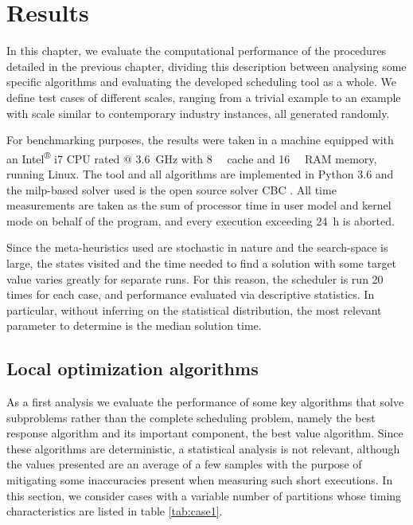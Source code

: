 \documentclass[main.tex]{subfiles}
\begin{document}
\chapter{Results}
\label{sec:results}

In this chapter, we evaluate the computational performance of the procedures detailed in the previous chapter, dividing this description between analysing some specific algorithms and evaluating the developed scheduling tool as a whole.
We define test cases of different scales, ranging from a trivial example to an example with scale similar to contemporary industry instances, all generated randomly.

For benchmarking purposes, the results were taken in a machine equipped with an Intel\textsuperscript{®} i7 CPU rated @ \SI{3.6}{\giga\hertz} with \SI{8}{\mega\byte} cache and \SI{16}{\giga\byte} RAM memory, running Linux.
The tool and all algorithms are implemented in Python 3.6 and the \gls{milp}-based solver used is the open source solver CBC \cite{cbc-solver}.
All time measurements are taken as the sum of processor time in user model and kernel mode on behalf of the program, and every execution exceeding \SI{24}{\hour} is aborted.

Since the meta-heuristics used are stochastic in nature and the search-space is large, the states visited and the time needed to find a solution with some target value varies greatly for separate runs.
For this reason, the scheduler is run \num{20} times for each case, and performance evaluated via descriptive statistics.
In particular, without inferring on the statistical distribution, the most relevant parameter to determine is the median solution time.

\section{Local optimization algorithms}

As a first analysis we evaluate the performance of some key algorithms that solve subproblems rather than the complete scheduling problem, namely the best response algorithm and its important component, the best value algorithm.
Since these algorithms are deterministic, a statistical analysis is not relevant, although the values presented are an average of a few samples with the purpose of mitigating some inaccuracies present when measuring such short executions.
In this section, we consider cases with a variable number of partitions whose timing characteristics are listed in table \ref{tab:case1}.
\end{document}
